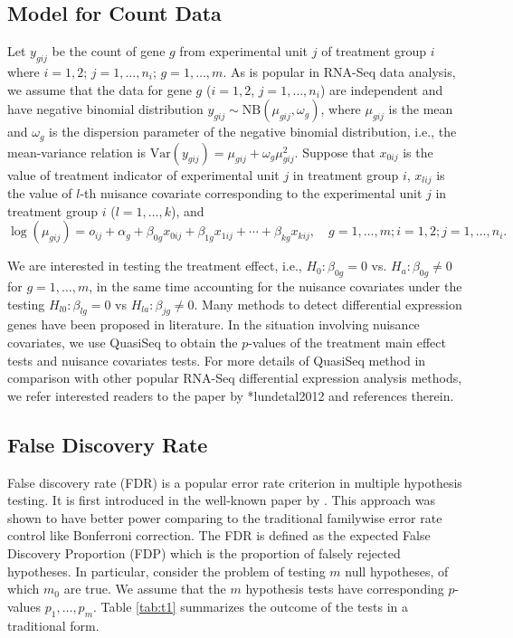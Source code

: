 \documentclass[12pt, letter]{article}\usepackage[]{graphicx}\usepackage[]{color}
\begin{document}
\subsection{ Model for Count Data}
Let $y_{gij}$ be the count of gene $g$ from experimental unit $j$ of treatment group $i$ where $i = 1,2$; $j = 1, \dots, n_i$; $g = 1, \dots, m$. As is popular in RNA-Seq data analysis, we assume that the data for gene $g$ ($i = 1, 2$, $j = 1, \dots, n_i$) are independent and have negative binomial distribution $y_{gij} \sim \mbox{NB}(\mu_{gij}, \omega_g)$, where $\mu_{gij}$ is the mean and $\omega_g$ is the dispersion parameter of the negative binomial distribution, i.e., the mean-variance relation is $\mbox{Var}(y_{gij}) = \mu_{gij} + \omega_g \mu_{gij}^2$. Suppose that $x_{0ij}$ is the value of treatment indicator of 
experimental unit $j$ in treatment group $i$, $x_{lij}$ is the value of $l$-th nuisance covariate corresponding to the experimental unit $j$ in treatment group $i$ ($l = 1, \dots, k$), and 
\[
\log(\mu_{gij}) = o_{ij} + \alpha_{g} + \beta_{0g}x_{0ij} + \beta_{1g}x_{1ij} + \cdots + \beta_{kg}x_{kij}, \quad g = 1, \dots, m; i = 1, 2; j = 1, \dots, n_i.
\]

We are interested in testing the treatment effect, i.e., $H_0: \beta_{0g} = 0$ vs. $H_a: \beta_{0g} \neq 0$ for $g =  1, \dots, m$, in the same time accounting for the nuisance covariates under the testing $H_{l0}: \beta_{lg} = 0$ vs $H_{la}: \beta_{jg} \neq 0$. Many methods to detect differential expression genes have been proposed in literature. In the situation involving nuisance covariates, we use QuasiSeq \cite{lundetal2012} to obtain the $p$-values of the treatment main effect tests and nuisance covariates tests. For more details of QuasiSeq method in comparison with other popular RNA-Seq differential expression analysis methods,  we refer interested readers to the paper by \citeasnoun**{lundetal2012} and references therein.

\subsection{ False Discovery Rate}
False discovery rate (FDR) is a popular error rate criterion  in multiple hypothesis testing.  It is first introduced in the well-known paper by . This approach was shown to have better power comparing to the traditional familywise error rate control like Bonferroni correction. The FDR is defined as the expected False Discovery Proportion (FDP) which is the  proportion of falsely rejected hypotheses. In particular, consider the problem of testing $m$ null hypotheses, of which $m_0$ are true. We assume that the $m$ hypothesis tests have corresponding $p$-values $p_1, \dots, p_m$. Table \ref{tab:t1} summarizes the outcome of the tests in a traditional form. 
\end{document}
